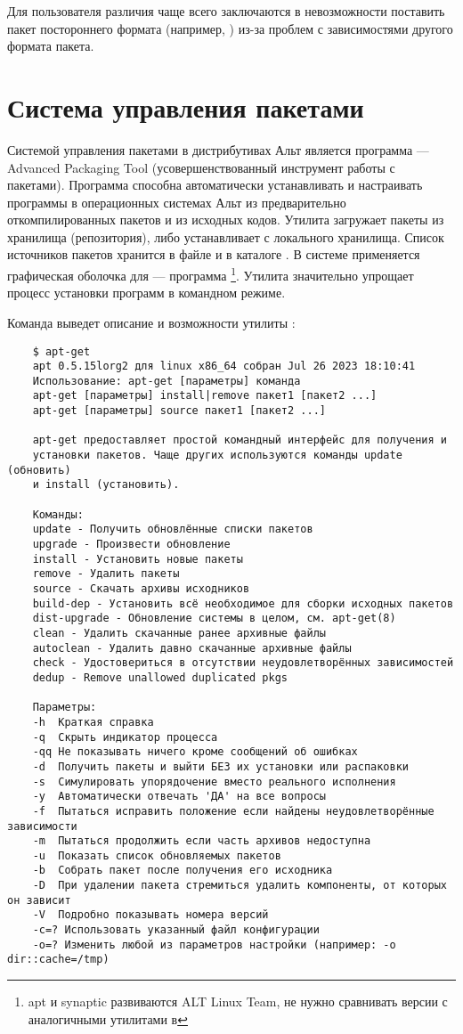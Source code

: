 Для пользователя различия чаще всего заключаются в невозможности поставить пакет постороннего 
формата (например, ) из-за проблем с зависимостями другого формата пакета. 

\section{Система управления пакетами}
Системой управления пакетами в дистрибутивах Альт является программа  --- 
Advanced Packaging Tool (усовершенствованный инструмент работы с пакетами). Программа  
способна автоматически устанавливать и настраивать программы в операционных системах Альт из 
предварительно откомпилированных пакетов и из исходных кодов. Утилита загружает пакеты из хранилища 
(репозитория), либо устанавливает с локального хранилища. Список источников пакетов хранится в файле 
 и в каталоге . В системе  
применяется графическая оболочка для  --- программа \footnote{apt и synaptic 
развиваются ALT Linux Team, не нужно сравнивать версии с аналогичными утилитами в }. Утилита  
значительно упрощает процесс установки программ в командном режиме.

Команда  выведет описание и возможности утилиты :
\begin{verbatim}
	$ apt-get
	apt 0.5.15lorg2 для linux x86_64 собран Jul 26 2023 18:10:41
	Использование: apt-get [параметры] команда
	apt-get [параметры] install|remove пакет1 [пакет2 ...]
	apt-get [параметры] source пакет1 [пакет2 ...]
	
	apt-get предоставляет простой командный интерфейс для получения и
	установки пакетов. Чаще других используются команды update (обновить)
	и install (установить).
	
	Команды:
	update - Получить обновлённые списки пакетов
	upgrade - Произвести обновление
	install - Установить новые пакеты
	remove - Удалить пакеты
	source - Скачать архивы исходников
	build-dep - Установить всё необходимое для сборки исходных пакетов
	dist-upgrade - Обновление системы в целом, см. apt-get(8)
	clean - Удалить скачанные ранее архивные файлы
	autoclean - Удалить давно скачанные архивные файлы
	check - Удостовериться в отсутствии неудовлетворённых зависимостей
	dedup - Remove unallowed duplicated pkgs
	
	Параметры:
	-h  Краткая справка
	-q  Скрыть индикатор процесса
	-qq Не показывать ничего кроме сообщений об ошибках
	-d  Получить пакеты и выйти БЕЗ их установки или распаковки
	-s  Симулировать упорядочение вместо реального исполнения
	-y  Автоматически отвечать 'ДА' на все вопросы
	-f  Пытаться исправить положение если найдены неудовлетворённые зависимости
	-m  Пытаться продолжить если часть архивов недоступна
	-u  Показать список обновляемых пакетов
	-b  Собрать пакет после получения его исходника
	-D  При удалении пакета стремиться удалить компоненты, от которых он зависит
	-V  Подробно показывать номера версий
	-c=? Использовать указанный файл конфигурации
	-o=? Изменить любой из параметров настройки (например: -o dir::cache=/tmp)
\end{verbatim}

